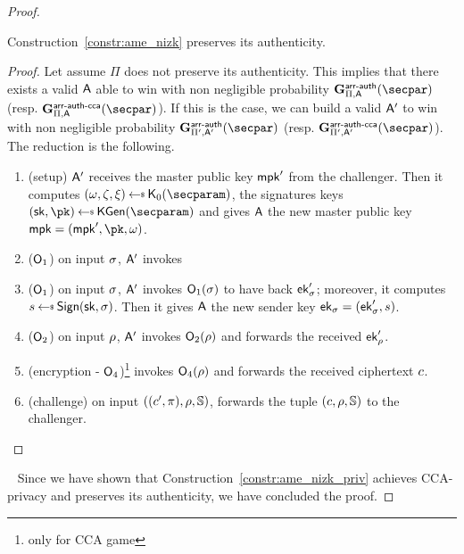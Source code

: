 \begin{proof}
    \begin{lemma}\label{lemma:ame_auth_same}
        Construction~\ref{constr:ame_nizk} preserves its authenticity.
        \begin{proof}
            Let assume $\Pi$ does not preserve its authenticity.
            This implies that there exists a valid $\mathsf{A}$ able to win with non negligible probability $\NISHeufgame{\arranged}_{\Pi, \adversary}(\secpar)$ (resp. $\NISHeufgamecca{\arranged}_{\Pi, \adversary}(\secpar)$).
            If this is the case, we can build a valid $\mathsf{A}'$ to win with non negligible probability $\NISHeufgame{\arranged}_{\Pi', \adversary'}(\secpar)$ (resp. $\NISHeufgamecca{\arranged}_{\Pi', \adversary'}(\secpar)$).
            The reduction is the following.

            \begin{enumerate}
                \item (setup) $\mathsf{A}'$ receives the master public key $\mathsf{mpk}'$ from the challenger. Then it computes $(\crs,\tpsim,\tpext)\getsr\nizkext_0(\secparam)$, the signatures keys $(\sk, \pk) \getsr \kgen(\secparam)$ and gives $\mathsf{A}$ the new master public key $\mpk = (\mpk', \pk, \crs)$.
                \item ($\mathsf{O}_1$) on input $\sigma$, $\mathsf{A}'$ invokes \item ($\mathsf{O}_1$) on input $\sigma$, $\mathsf{A}'$ invokes $\mathsf{O}_1(\sigma)$ to have back $\mathsf{ek}'_\sigma$; moreover, it computes $\signature \getsr \sign(\sk, \sattr)$. Then it gives $\mathsf{A}$ the new sender key $\mathsf{ek}_\sigma = (\mathsf{ek}'_\sigma, s)$.
                \item ($\mathsf{O}_2$) on input $\rho$, $\mathsf{A}'$ invokes $\mathsf{O}_2(\rho)$ and forwards the received $\mathsf{ek}'_\rho$.
                \item (encryption - $\mathsf{O}_4$)\footnote{only for CCA game} invokes $\mathsf{O}_4(\rho)$ and forwards the received ciphertext $c$.
                \item (challenge) on input $((c', \pi), \rho, \mathbb{S})$, forwards the tuple $(c, \rho, \mathbb{S})$ to the challenger.
            \end{enumerate}
        \end{proof}
    \end{lemma}
    ~\newline
    Since we have shown that Construction~\ref{constr:ame_nizk_priv} achieves CCA-privacy and preserves its authenticity, we have concluded the proof.
\end{proof}
